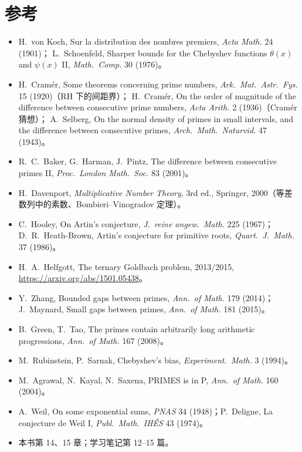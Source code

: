 \documentclass[11pt]{article}
\begin{document}
\section*{参考}
\begin{itemize}
 \item H.\ von Koch, Sur la distribution des nombres premiers, \emph{Acta Math.} 24 (1901)；
 L.\ Schoenfeld, Sharper bounds for the Chebyshev functions $\theta(x)$ and $\psi(x)$ II, \emph{Math.\ Comp.} 30 (1976)。
 \item H.\ Cramér, Some theorems concerning prime numbers, \emph{Ark.\ Mat.\ Astr.\ Fys.} 15 (1920)（RH 下的间距界）；
 H.\ Cramér, On the order of magnitude of the difference between consecutive prime numbers, \emph{Acta Arith.} 2 (1936)（Cramér 猜想）；
 A.\ Selberg, On the normal density of primes in small intervals, and the difference between consecutive primes, \emph{Arch.\ Math.\ Naturvid.} 47 (1943)。
 \item R.\ C.\ Baker, G.\ Harman, J.\ Pintz, The difference between consecutive primes II, \emph{Proc.\ London Math.\ Soc.} 83 (2001)。
 \item H.\ Davenport, \emph{Multiplicative Number Theory}, 3rd ed., Springer, 2000（等差数列中的素数、Bombieri--Vinogradov 定理）。
 \item C.\ Hooley, On Artin's conjecture, \emph{J.\ reine angew.\ Math.} 225 (1967)；
 D.\ R.\ Heath-Brown, Artin's conjecture for primitive roots, \emph{Quart.\ J.\ Math.} 37 (1986)。
 \item H.\ A.\ Helfgott, The ternary Goldbach problem, 2013/2015, \url{https://arxiv.org/abs/1501.05438}。
 \item Y.\ Zhang, Bounded gaps between primes, \emph{Ann.\ of Math.} 179 (2014)；
 J.\ Maynard, Small gaps between primes, \emph{Ann.\ of Math.} 181 (2015)。
 \item B.\ Green, T.\ Tao, The primes contain arbitrarily long arithmetic progressions, \emph{Ann.\ of Math.} 167 (2008)。
 \item M.\ Rubinstein, P.\ Sarnak, Chebyshev's bias, \emph{Experiment.\ Math.} 3 (1994)。
 \item M.\ Agrawal, N.\ Kayal, N.\ Saxena, PRIMES is in P, \emph{Ann.\ of Math.} 160 (2004)。
 \item A.\ Weil, On some exponential sums, \emph{PNAS} 34 (1948)；P.\ Deligne, La conjecture de Weil I, \emph{Publ.\ Math.\ IHÉS} 43 (1974)。
 \item 本书第 14、15 章；学习笔记第 12--15 篇。
\end{itemize}
\end{document}
